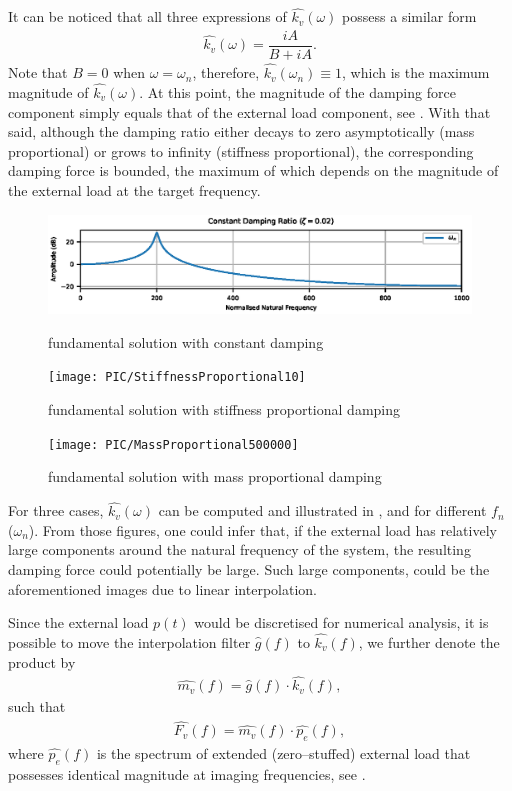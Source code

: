 It can be noticed that all three expressions of $\hat{k_v}\left(\omega\right)$ possess a similar form
\begin{gather}\label{eq:general_damping_force}
\hat{k_v}\left(\omega\right)=\dfrac{iA}{B+iA}.
\end{gather}
Note that $B=0$ when $\omega=\omega_n$, therefore, $\hat{k_v}\left(\omega_n\right)\equiv1$, which is the maximum magnitude of $\hat{k_v}\left(\omega\right)$. At this point, the magnitude of the damping force component simply equals that of the external load component, see . With that said, although the damping ratio either decays to zero asymptotically (mass proportional) or grows to infinity (stiffness proportional), the corresponding damping force is bounded, the maximum of which depends on the magnitude of the external load at the target frequency.

\begin{figure}[htb!]
\centering
\includegraphics{PIC/ConstantProportional2000}
\caption{fundamental solution with constant damping}\label{fig:constant_damping}
\texttt{[image: PIC/StiffnessProportional10]}
\caption{fundamental solution with stiffness proportional damping}\label{fig:k_proportional}
\texttt{[image: PIC/MassProportional500000]}
\caption{fundamental solution with mass proportional damping}\label{fig:m_proportional}
\end{figure}
For three cases, $\hat{k_v}\left(\omega\right)$ can be computed and illustrated in ,  and  for different $f_n$ ($\omega_n$). From those figures, one could infer that, if the external load has relatively large components around the natural frequency of the system, the resulting damping force could potentially be large. Such large components, could be the aforementioned images due to linear interpolation.

Since the external load $p\left(t\right)$ would be discretised for numerical analysis, it is possible to move the interpolation filter $\hat{g}\left(f\right)$ to $\hat{k_v}\left(f\right)$, we further denote the product by
\begin{gather}
\hat{m_v}\left(f\right)=\hat{g}\left(f\right)\cdot\hat{k_v}\left(f\right),
\end{gather}
such that
\begin{gather}
\hat{F_v}\left(f\right)=\hat{m_v}\left(f\right)\cdot\hat{p_e}\left(f\right),
\end{gather}
where $\hat{p_e}\left(f\right)$ is the spectrum of extended (zero--stuffed) external load that possesses identical magnitude at imaging frequencies, see .

